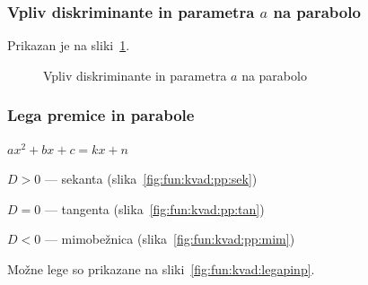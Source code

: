 \documentclass[a4paper,oneside,12pt,fleqn]{article}
\newcommand{\beforecaptionskip}{\vspace{-12pt}}
\numberwithin{equation}{section}
\newenvironment{itemize*}%
{
\vspace{-12pt}%
\begin{itemize}%
\setlength{\itemsep}{0pt}%
\setlength{\parskip}{2pt}}%
{\end{itemize}}
\begin{document}
\subsubsection{Vpliv diskriminante in parametra $a$ na parabolo}
Prikazan je na sliki~\ref{fig:fun:kvad:aD}.
\begin{figure}[ht]
  \begin{center}
  \end{center}
  \beforecaptionskip
  \caption{Vpliv diskriminante in parametra $a$ na parabolo}
  \label{fig:fun:kvad:aD}
\end{figure}

\subsubsection{Lega premice in parabole}
\label{sec:fun:kvad:legapinp}
$ax^2 +bx + c = kx + n$
\begin{itemize*}
  \item $D > 0$ --- sekanta (slika~\ref{fig:fun:kvad:pp:sek})
  \item $D = 0$ --- tangenta (slika~\ref{fig:fun:kvad:pp:tan})
  \item $D < 0$ --- mimobežnica (slika~\ref{fig:fun:kvad:pp:mim})
\end{itemize*}
Možne lege so prikazane na sliki~\ref{fig:fun:kvad:legapinp}.
\end{document}
